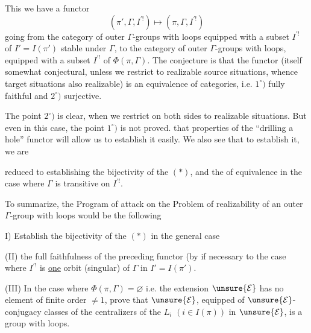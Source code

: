 
This   we have  a functor
\[
(\pi',\Gamma,I^{\prime !})\longmapsto(\pi,\Gamma,I^{\prime !})
\]
going from the category of outer $\Gamma$-groups with loops
 equipped with a subset $I^{\prime !}$ of $I'=I(\pi')$ stable
under $\Gamma$, to the category of outer $\Gamma$-groups with loops, equipped with a subset $I^{\prime !}$ of
$\Phi(\pi,\Gamma)$. The conjecture is that the functor
(itself somewhat conjectural, unless we restrict to realizable source situations, whence target situations also realizable) is an equivalence of categories, i.e. $1^\circ)$ fully faithful and $2^\circ)$  surjective. 

The point $2^\circ)$ is clear, when we restrict on both sides to realizable situations. But even in this case, the point $1^\circ)$ is not proved.
  that
properties of the ``drilling a hole'' functor will allow us to establish it easily. We also see that to establish it, we are


reduced to establishing the bijectivity of the $(*)$, and the  of equivalence in the case where $\Gamma$ is transitive on $I^{\prime !}$.

To summarize, the Program of attack on the Problem of realizability of an outer $\Gamma$-group with loops would be the following

I) Establish the bijectivity of the $(*)$ in the general case

(II)  the full faithfulness of the preceding functor (by  if necessary to the case where $I^{\prime !}$ is \uline{one} orbit (singular) of $\Gamma$ in $I'=I(\pi')$.

(III) In the case where $\Phi(\pi,\Gamma)=\varnothing$ i.e. the extension $\unsure{\mathcal E}$ has no element of finite order $\ne1$, prove that $\unsure{\mathcal E}$, equipped  of $\unsure{\mathcal E}$-conjugacy classes of the centralizers of the $L_i$ $(i\in I(\pi))$ in $\unsure{\mathcal E}$, is a group with loops.

